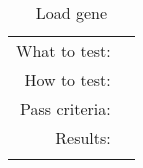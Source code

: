 \begin{table}[H]
  \begin{tabular}{r | p{8cm}}
    \noalign{\smallskip}\hline\noalign{\smallskip}
    
    What to test:  &  \\

    \noalign{\smallskip}\hline\noalign{\smallskip}

    How to test:   &  \\

    \noalign{\smallskip}\hline\noalign{\smallskip}

    Pass criteria: &  \\

    \noalign{\smallskip}\hline\noalign{\smallskip}
    
    Results: &   \\
   \noalign{\smallskip}\hline\noalign{\smallskip}
  
  
  
  \end{tabular}
  \caption{Load gene}
  \label{testing:fitness:load_gene}
\end{table}
